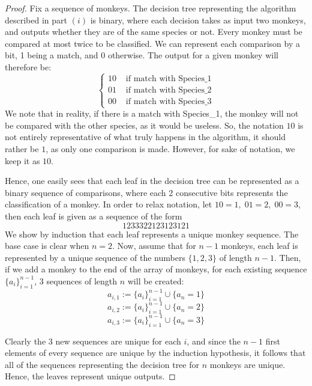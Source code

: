 \documentclass[12pt]{article}
\theoremstyle{definition}
\theoremstyle{remark}
\begin{document}
\begin{enumerate}
\begin{enumerate}
\begin{proof} 
    Fix a sequence of monkeys. The decision tree representing the algorithm described in part $(i)$ is binary, where each decision takes as input two monkeys, and outputs whether they are of the same species or not. Every monkey must be compared at most twice to be classified. We can represent each comparison by a bit, 1 being a match, and 0 otherwise. The output for a given monkey will therefore be: 
   $$\left\{ \begin{matrix}
     10 & \text{ if match with Species\_1} \\ 
01 & \text{ if match with Species\_2} \\ 
00 & \text{ if match with Species\_3} 
   \end{matrix} \right.$$
    We note that in reality, if there is a match with Species\_1, the monkey will not be compared with the other species, as it would be useless. So, the notation $10$ is not entirely representative of what truly happens in the algorithm, it should rather be $1$, as only one comparison is made. However, for sake of notation, we keep it as $10.$

    \hspace{24pt}Hence, one easily sees that each leaf in the decision tree can be represented as a binary sequence of comparisons, where each 2 consecutive bits represents the classification of a monkey. In order to relax notation, let $10 = 1, \; 01 = 2,\; 00 = 3 $, then each leaf is given as a sequence of the form
    $$1233322123123121$$
    We show by induction that each leaf represents a unique monkey sequence. The base case is clear when $n =2$. Now, assume that for $n-1$ monkeys, each leaf is represented by a unique sequence of the numbers $\{1,2,3\}$ of length $n-1$. Then, if we add a monkey to the end of the array of monkeys, for each existing sequence $\{a_i\}_{i=1}^{n-1}$, 3 sequences of length $n$ will be created: 
    $$a_{i,1} := \{a_i\}_{i=1}^{n-1}\cup \{a_n = 1\}  $$
  $$a_{i,2} := \{a_i\}_{i=1}^{n-1}\cup \{a_n = 2\}  $$
  $$a_{i,3} := \{a_i\}_{i=1}^{n-1}\cup \{a_n = 3\}  $$

  Clearly the 3 new sequences are unique for each $i$, and since the $n-1$ first elements of every sequence are unique by the induction hypothesis, it follows that all of the sequences representing the decision tree for $n$ monkeys are unique. Hence, the leaves represent unique outputs. 


\end{proof}
\end{enumerate}
\end{enumerate}
\end{document}
